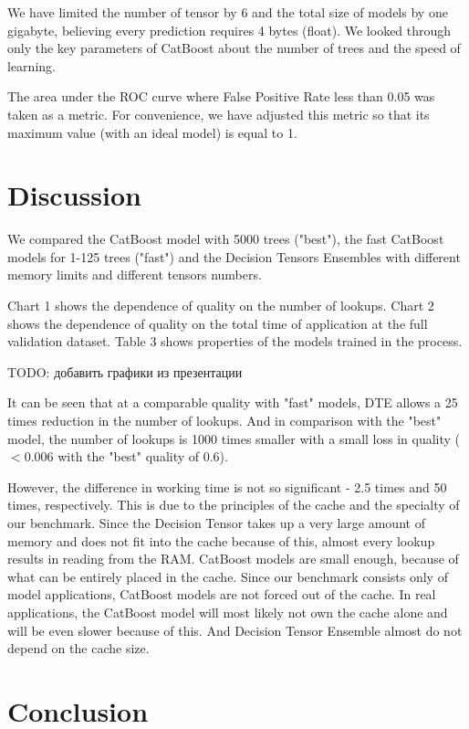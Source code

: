 \documentclass[a4paper]{jpconf}
\begin{document}
We have limited the number of tensor by 6 and the total size of models by one gigabyte, believing every prediction requires 4 bytes (float). We looked through only the key parameters of CatBoost about the number of trees and the speed of learning.


The area under the ROC curve where False Positive Rate less than 0.05 was taken as a metric. For convenience, we have adjusted this metric so that its maximum value (with an ideal model) is equal to 1.

\section{Discussion}

We compared the CatBoost model with 5000 trees ("best"), the fast CatBoost models for 1-125 trees ("fast") and the Decision Tensors Ensembles with different memory limits and different tensors numbers.

Chart 1 shows the dependence of quality on the number of lookups. Chart 2 shows the dependence of quality on the total time of application at the full validation dataset. Table 3 shows properties of the models trained in the process.

TODO: добавить графики из презентации

It can be seen that at a comparable quality with "fast" models, DTE allows a 25 times reduction in the number of lookups. And in comparison with the "best" model, the number of lookups is 1000 times smaller with a small loss in quality ($ <0.006 $ with the "best" quality of 0.6).

However, the difference in working time is not so significant - 2.5 times and 50 times, respectively. This is due to the principles of the cache and the specialty of our benchmark. Since the Decision Tensor takes up a very large amount of memory and does not fit into the cache because of this, almost every lookup results in reading from the RAM. CatBoost models are small enough, because of what can be entirely placed in the cache. Since our benchmark consists only of model applications, CatBoost models are not forced out of the cache. In real applications, the CatBoost model will most likely not own the cache alone and will be even slower because of this. And Decision Tensor Ensemble almost do not depend on the cache size.

\section{Conclusion}
\end{document}
